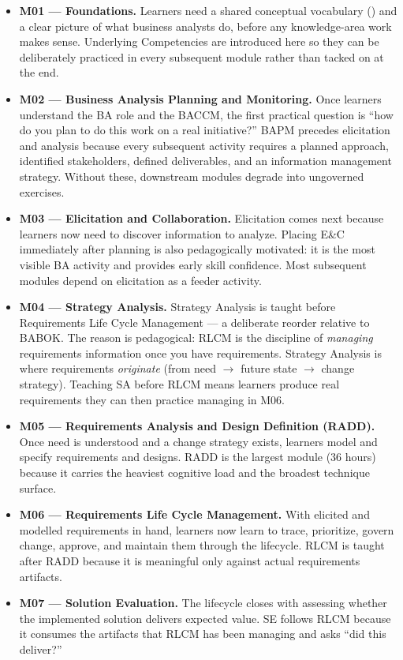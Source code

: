 \documentclass[11pt,letterpaper,oneside]{report}
\begin{document}
\begin{itemize}
  \item \textbf{M01 --- Foundations.} Learners need a shared conceptual vocabulary () and a clear picture of what business analysts do, before any knowledge-area work makes sense. Underlying Competencies are introduced here so they can be deliberately practiced in every subsequent module rather than tacked on at the end.
  \item \textbf{M02 --- Business Analysis Planning and Monitoring.} Once learners understand the BA role and the BACCM, the first practical question is ``how do you plan to do this work on a real initiative?'' BAPM precedes elicitation and analysis because every subsequent activity requires a planned approach, identified stakeholders, defined deliverables, and an information management strategy. Without these, downstream modules degrade into ungoverned exercises.
  \item \textbf{M03 --- Elicitation and Collaboration.} Elicitation comes next because learners now need to discover information to analyze. Placing E\&C immediately after planning is also pedagogically motivated: it is the most visible BA activity and provides early skill confidence. Most subsequent modules depend on elicitation as a feeder activity.
  \item \textbf{M04 --- Strategy Analysis.} Strategy Analysis is taught before Requirements Life Cycle Management --- a deliberate reorder relative to BABOK. The reason is pedagogical: RLCM is the discipline of \emph{managing} requirements information once you have requirements. Strategy Analysis is where requirements \emph{originate} (from need $\to$ future state $\to$ change strategy). Teaching SA before RLCM means learners produce real requirements they can then practice managing in M06.
  \item \textbf{M05 --- Requirements Analysis and Design Definition (RADD).} Once need is understood and a change strategy exists, learners model and specify requirements and designs. RADD is the largest module (36 hours) because it carries the heaviest cognitive load and the broadest technique surface.
  \item \textbf{M06 --- Requirements Life Cycle Management.} With elicited and modelled requirements in hand, learners now learn to trace, prioritize, govern change, approve, and maintain them through the lifecycle. RLCM is taught after RADD because it is meaningful only against actual requirements artifacts.
  \item \textbf{M07 --- Solution Evaluation.} The lifecycle closes with assessing whether the implemented solution delivers expected value. SE follows RLCM because it consumes the artifacts that RLCM has been managing and asks ``did this deliver?''

\end{itemize}
\end{document}
